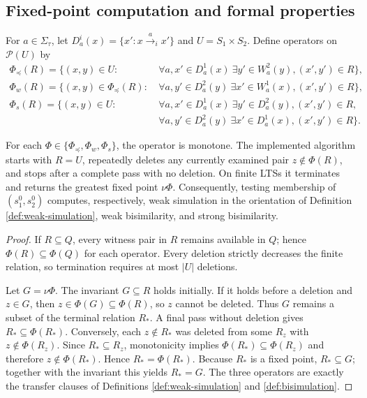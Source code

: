 \documentclass{ws-jbcb}
\numberwithin{equation}{section}
\newcommand{\TAU}{\tau}
\newcommand{\powerset}{\mathcal{P}}
\begin{document}
\subsection{Fixed-point computation and formal properties}
\label{sec:fixed-point}

For $a\in\Sigma_{\TAU}$, let $D_a^i(x)=\{x':x\xrightarrow{a}_i x'\}$ and
$U=S_1\times S_2$. Define operators on $\powerset(U)$ by
\begin{align}
\Phi_{\preceq}(R)=\{(x,y)\in U:
 &\ \forall a,x'\in D_a^1(x)\ \exists y'\in W_a^2(y),
 (x',y')\in R\},\label{eq:sim-operator}\\
\Phi_w(R)=\{(x,y)\in\Phi_{\preceq}(R):
 &\ \forall a,y'\in D_a^2(y)\ \exists x'\in W_a^1(x),
 (x',y')\in R\},\label{eq:weak-bisim-operator}\\
\Phi_s(R)=\{(x,y)\in U:
 &\ \forall a,x'\in D_a^1(x)\ \exists y'\in D_a^2(y),
 (x',y')\in R,\nonumber\\
 &\ \forall a,y'\in D_a^2(y)\ \exists x'\in D_a^1(x),
 (x',y')\in R\}.\label{eq:strong-bisim-operator}
\end{align}

\begin{theorem}\label{thm:fixed-point}
For each $\Phi\in\{\Phi_{\preceq},\Phi_w,\Phi_s\}$, the operator is monotone.
The implemented algorithm starts with $R=U$, repeatedly deletes any currently
examined pair $z\notin\Phi(R)$, and stops after a complete pass with no deletion.
On finite LTSs it terminates and returns the greatest fixed point $\nu\Phi$.
Consequently, testing membership of $(s_1^0,s_2^0)$ computes, respectively,
weak simulation in the orientation of Definition \ref{def:weak-simulation}, weak
bisimilarity, and strong bisimilarity.
\end{theorem}

\begin{proof}
If $R\subseteq Q$, every witness pair in $R$ remains available in $Q$; hence
$\Phi(R)\subseteq\Phi(Q)$ for each operator. Every deletion strictly decreases
the finite relation, so termination requires at most $|U|$ deletions.

Let $G=\nu\Phi$. The invariant $G\subseteq R$ holds initially. If it holds before
a deletion and $z\in G$, then
$z\in\Phi(G)\subseteq\Phi(R)$, so $z$ cannot be deleted. Thus $G$ remains a
subset of the terminal relation $R_*$. A final pass without deletion gives
$R_*\subseteq\Phi(R_*)$. Conversely, each $z\notin R_*$ was deleted from some
$R_z$ with $z\notin\Phi(R_z)$. Since $R_*\subseteq R_z$, monotonicity implies
$\Phi(R_*)\subseteq\Phi(R_z)$ and therefore $z\notin\Phi(R_*)$. Hence
$R_*=\Phi(R_*)$. Because $R_*$ is a fixed point, $R_*\subseteq G$; together
with the invariant this yields $R_*=G$. The three operators are exactly the
transfer clauses of Definitions \ref{def:weak-simulation} and
\ref{def:bisimulation}.
\end{proof}
\end{document}
